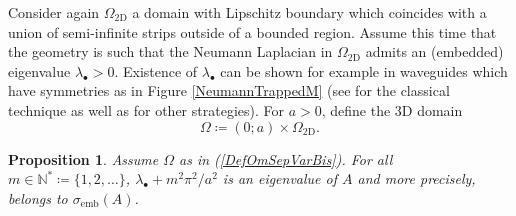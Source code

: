 \documentclass[11pt,a4paper]{article}
\newcommand{\Om}{\Omega}
\newcommand{\mrm}[1]{\mathrm{#1}}
\newcommand{\N}{\mathbb{N}}
\newtheorem{proposition}[theorem]{Proposition}
\begin{document}
\noindent Consider again $\Om_{\mrm{2D}}$ a domain with Lipschitz boundary which coincides with a union of semi-infinite strips outside of a bounded region. Assume this time that the geometry is such that the Neumann Laplacian in $\Om_{\mrm{2D}}$ admits an (embedded) eigenvalue $\lambda_\bullet>0$. Existence of $\lambda_\bullet$ can be shown for example in waveguides which have symmetries as in Figure \ref{NeumannTrappedM} (see \cite{EvLV94} for the classical technique as well as \cite{ChPa18,ChPa19} for other strategies). For $a>0$, define the 3D domain
\begin{equation}\label{DefOmSepVarBis}
\Om\coloneqq(0;a)\times\Om_{\mrm{2D}}.
\end{equation}
\begin{proposition}
Assume $\Om$ as in (\ref{DefOmSepVarBis}). For all $m\in\N^\ast\coloneqq\{1,2,\dots\}$, $\lambda_{\bullet}+m^2\pi^2/a^2$ is an eigenvalue of $A$ and more precisely, belongs to $\sigma_{\mrm{emb}}(A)$.
\end{proposition}
\end{document}
